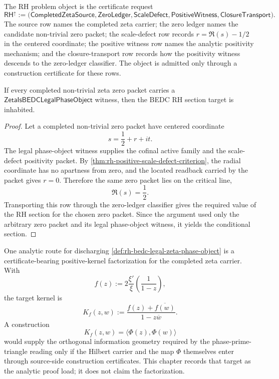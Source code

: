 \begin{definition}
\label{def:rh-problem-object}
The RH problem object is the certificate request
$$
\mathsf{RH}^{\uparrow}
:=
\bigl(
\mathsf{CompletedZetaSource},
\mathsf{ZeroLedger},
\mathsf{ScaleDefect},
\mathsf{PositiveWitness},
\mathsf{ClosureTransport}
\bigr).
$$
The source row names the completed zeta carrier; the zero ledger names the
candidate non-trivial zero packet; the scale-defect row records
$r=\Re(s)-1/2$ in the centered coordinate; the positive witness row names
the analytic positivity mechanism; and the closure-transport row records
how the positivity witness descends to the zero-ledger classifier. The
object is admitted only through a construction certificate for these
rows.
\end{definition}

\begin{theorem}
\label{thm:rh-legal-zeta-phase-object-conditionally-sufficient}
If every completed non-trivial zeta zero packet carries a
$\mathsf{ZetaIsBEDCLegalPhaseObject}$ witness, then the BEDC RH section
target is inhabited.
\end{theorem}

\begin{proof}
Let a completed non-trivial zero packet have centered coordinate
$$
s=\frac12+r+it.
$$
The legal phase-object witness supplies the cofinal active family and the
scale-defect positivity packet. By
\autoref{thm:rh-positive-scale-defect-criterion}, the radial coordinate
has no apartness from zero, and the located readback carried by the packet
gives $r=0$. Therefore the same zero packet lies on the critical line,
$$
\Re(s)=\frac12.
$$
Transporting this row through the zero-ledger classifier gives the
required value of the RH section for the chosen zero packet. Since the
argument used only the arbitrary zero packet and its legal phase-object
witness, it yields the conditional section.
\end{proof}

\begin{principle}
\label{prin:rh-pick-herglotz-analytic-discharge}
One analytic route for discharging
\autoref{def:rh-bedc-legal-zeta-phase-object} is a certificate-bearing
positive-kernel factorization for the completed zeta carrier. With
$$
f(z)
:=
2\frac{\xi'}{\xi}\left(\frac1{1-z}\right),
$$
the target kernel is
$$
K_f(z,w)
:=
\frac{f(z)+\overline{f(w)}}{1-z\overline w}.
$$
A construction
$$
K_f(z,w)=\langle\Phi(z),\Phi(w)\rangle
$$
would supply the orthogonal information geometry required by the
phase-prime-triangle reading only if the Hilbert carrier and the map
$\Phi$ themselves enter through source-side construction certificates.
This chapter records that target as the analytic proof load; it does not
claim the factorization.
\end{principle}

